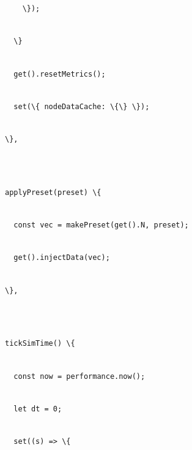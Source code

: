 \documentclass[
]{article}
\newcommand{\passthrough}[1]{#1}
\begin{document}
\passthrough{\lstinline!    !}\passthrough{\lstinline!\});!}\strut \\
\passthrough{\lstinline!  !}\passthrough{\lstinline!\}!}\strut \\
\passthrough{\lstinline!  !}\passthrough{\lstinline!get().!}\passthrough{\lstinline!resetMetrics!}\passthrough{\lstinline!();!}\strut \\
\passthrough{\lstinline!  !}\passthrough{\lstinline!set(\{!}\passthrough{\lstinline! !}\passthrough{\lstinline!nodeDataCache!}\passthrough{\lstinline!:!}\passthrough{\lstinline! !}\passthrough{\lstinline!\{\}!}\passthrough{\lstinline! !}\passthrough{\lstinline!\});!}\strut \\
\passthrough{\lstinline!\},!}\strut \\
\strut \\
\passthrough{\lstinline!applyPreset!}\passthrough{\lstinline!(preset)!}\passthrough{\lstinline! !}\passthrough{\lstinline!\{!}\strut \\
\passthrough{\lstinline!  !}\passthrough{\lstinline!const!}\passthrough{\lstinline! !}\passthrough{\lstinline!vec!}\passthrough{\lstinline! !}\passthrough{\lstinline!=!}\passthrough{\lstinline! !}\passthrough{\lstinline!makePreset!}\passthrough{\lstinline!(get().N,!}\passthrough{\lstinline! !}\passthrough{\lstinline!preset);!}\strut \\
\passthrough{\lstinline!  !}\passthrough{\lstinline!get().!}\passthrough{\lstinline!injectData!}\passthrough{\lstinline!(!}\passthrough{\lstinline!vec!}\passthrough{\lstinline!);!}\strut \\
\passthrough{\lstinline!\},!}\strut \\
\strut \\
\passthrough{\lstinline!tickSimTime!}\passthrough{\lstinline!()!}\passthrough{\lstinline! !}\passthrough{\lstinline!\{!}\strut \\
\passthrough{\lstinline!  !}\passthrough{\lstinline!const!}\passthrough{\lstinline! !}\passthrough{\lstinline!now!}\passthrough{\lstinline! !}\passthrough{\lstinline!=!}\passthrough{\lstinline! !}\passthrough{\lstinline!performance.now!}\passthrough{\lstinline!();!}\strut \\
\passthrough{\lstinline!  !}\passthrough{\lstinline!let!}\passthrough{\lstinline! !}\passthrough{\lstinline!dt!}\passthrough{\lstinline! !}\passthrough{\lstinline!=!}\passthrough{\lstinline! !}\passthrough{\lstinline!0;!}\strut \\
\passthrough{\lstinline!  !}\passthrough{\lstinline!set((s)!}\passthrough{\lstinline! !}\passthrough{\lstinline!=>!}\passthrough{\lstinline! !}\passthrough{\lstinline!\{!}\strut \\
\end{document}
